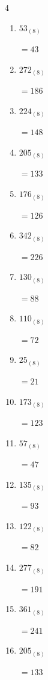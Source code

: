 \begin{multicols}{4}
\begin{enumerate}
  \item $53_{(8)}$

        $=43$

  \item $272_{(8)}$

        $=186$

  \item $224_{(8)}$

        $=148$

\columnbreak %

\resetques

  \item $205_{(8)}$

        $=133$

  \item $176_{(8)}$

        $=126$

  \item $342_{(8)}$

        $=226$

  \item $130_{(8)}$

        $=88$

  \item $110_{(8)}$

        $=72$

  \item $25_{(8)}$

        $=21$

  \item $173_{(8)}$

        $=123$

  \item $57_{(8)}$

        $=47$

  \item $135_{(8)}$

        $=93$

  \item $122_{(8)}$

        $=82$

  \item $277_{(8)}$

        $=191$

  \item $361_{(8)}$

        $=241$

  \item $205_{(8)}$

        $=133$


\end{enumerate}
\end{multicols}
